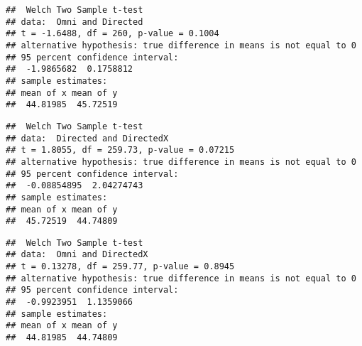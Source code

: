 \begin{verbatim}
##  Welch Two Sample t-test
## data:  Omni and Directed
## t = -1.6488, df = 260, p-value = 0.1004
## alternative hypothesis: true difference in means is not equal to 0
## 95 percent confidence interval:
##  -1.9865682  0.1758812
## sample estimates:
## mean of x mean of y 
##  44.81985  45.72519
\end{verbatim}

\begin{Shaded}
\begin{Highlighting}[]
 \NormalTok{)}
\end{Highlighting}
\end{Shaded}

\begin{verbatim}
##  Welch Two Sample t-test
## data:  Directed and DirectedX
## t = 1.8055, df = 259.73, p-value = 0.07215
## alternative hypothesis: true difference in means is not equal to 0
## 95 percent confidence interval:
##  -0.08854895  2.04274743
## sample estimates:
## mean of x mean of y 
##  45.72519  44.74809
\end{verbatim}

\begin{Shaded}
\begin{Highlighting}[]
 \NormalTok{)}
\end{Highlighting}
\end{Shaded}

\begin{verbatim}
##  Welch Two Sample t-test
## data:  Omni and DirectedX
## t = 0.13278, df = 259.77, p-value = 0.8945
## alternative hypothesis: true difference in means is not equal to 0
## 95 percent confidence interval:
##  -0.9923951  1.1359066
## sample estimates:
## mean of x mean of y 
##  44.81985  44.74809
\end{verbatim}

\pagebreak


\begin{Shaded}
\begin{Highlighting}[]
 \NormalTok{)}
\end{Highlighting}
\end{Shaded}
% 


